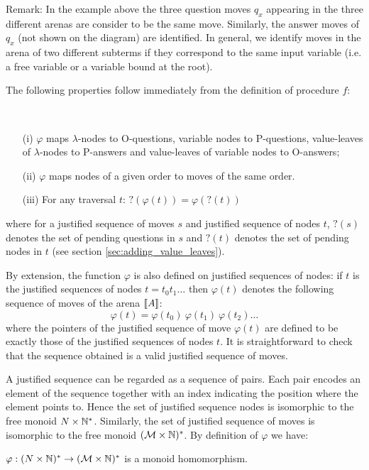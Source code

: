 Remark: In the example above the three question moves $q_x$ appearing in the three different arenas are consider to be the same move.
Similarly, the answer moves of $q_x$ (not shown on the diagram) are identified.
In general, we identify moves in the arena of two different subterms if they correspond to the same input variable
(i.e. a free variable or a variable bound at the root).

The following properties follow immediately from the definition of procedure $f$:
\begin{property} \
\label{proper:phi_conserve_order}
\begin{itemize}
\item[(i)] $\varphi$ maps $\lambda$-nodes to O-questions, variable nodes to
P-questions, value-leaves of $\lambda$-nodes to P-answers and
value-leaves of variable nodes to O-answers;
\item[(ii)] $\varphi$ maps nodes of a given order to moves of the same order.
\item[(iii)] For any traversal $t$: $?(\varphi(t)) = \varphi(?(t))$
\end{itemize}
where for a justified sequence of moves $s$ and justified sequence of nodes $t$,  $?(s)$ denotes the
set of pending questions in $s$ and $?(t)$ denotes the
set of pending nodes in $t$ (see section \ref{sec:adding_value_leaves}).
\end{property}


By extension, the function $\varphi$ is also defined on justified
sequences of nodes: if $t$ is the justified sequences of nodes $t =
t_0 t_1 \ldots$ then $\varphi(t)$ denotes the following sequence of
moves of the arena ${[\![ A ]\!]}$:
$$\varphi(t) = \varphi(t_0)\ \varphi(t_1)\  \varphi(t_2) \ldots$$
where the pointers of the justified sequence of move $\varphi(t)$
are defined to be exactly those of the justified sequences of nodes
$t$. It is straightforward to check that the sequence obtained is a
valid justified sequence of moves.


A justified sequence can be regarded as a sequence of pairs. Each pair encodes an element of the sequence together
with an index indicating the position where the element points to. Hence the set of justified sequence nodes is isomorphic
to the free monoid $N \times \mathbb{N}^*$. Similarly, the set of justified sequence of moves is isomorphic to
the free monoid $(\mathcal{M} \times \mathbb{N})^*$. By definition of $\varphi$ we have:
\begin{lem}
\label{lem:varphi_monoidhomom}
$\varphi : (N \times \mathbb{N})^* \rightarrow (\mathcal{M} \times \mathbb{N})^*$ is a monoid homomorphism.
\end{lem}


